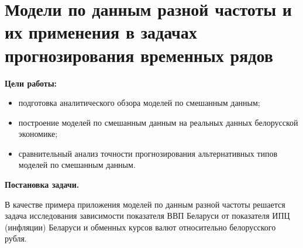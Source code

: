 \documentclass[a4paper, 12pt]{extarticle}
\begin{document}
	\section*{Модели по данным разной частоты и их применения в задачах прогнозирования временных рядов}
	\textbf{Цели работы:}
	\begin{itemize}
		\item подготовка аналитического обзора моделей по смешанным данным;
		\item построение моделей по смешанным данным на реальных данных белорусской экономике;
		\item сравнительный анализ точности прогнозирования альтернативных типов моделей по смешанным данным.
	\end{itemize}
	\textbf{Постановка задачи.} 
	
	В качестве примера приложения моделей по данным разной частоты решается задача исследования зависимости показателя ВВП Беларуси от показателя ИПЦ (инфляции) Беларуси и обменных курсов валют относительно белорусского рубля.
	
\end{document}
